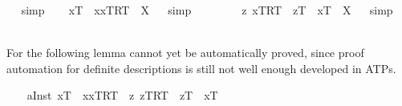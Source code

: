 \begin{isabellebody}
\isadelimproof
\ %
\endisadelimproof
%
\isatagproof
{}\isamarkupfalse%
\ simp\ \isamarkupfalse%
%
\endisatagproof
{\isafoldproof}%
%
\isadelimproof
%
\endisadelimproof
%
\isamarkuptrue%
\ \isamarkupfalse%
\ {\isachardoublequoteopen}{\isacharparenleft}x\isactrlsup T\ \isactrlbold {\isacharequal}\ {\isacharparenleft}\isactrlbold {\isasymiota}x{\isachardot}{\isasymlbrace}x\isactrlsup T{\isacharcomma}R\isactrlsup T{\isasymrbrace}{\isacharparenright}{\isacharparenright}\ {\isacharequal}\ X{\isachardoublequoteclose}%
\isadelimproof
\ %
\endisadelimproof
%
\isatagproof
{}\isamarkupfalse%
\ simp\ \isamarkupfalse%
\ \ \ \ %
%
\endisatagproof
{\isafoldproof}%
%
\isadelimproof
%
\endisadelimproof
\isanewline
\ \isamarkupfalse%
\ {\isachardoublequoteopen}{\isacharparenleft}\isactrlbold {\isasymforall}z{\isachardot}\ {\isacharparenleft}\isactrlbold {\isasymA}{\isacharparenleft}{\isasymlbrace}x\isactrlsup T{\isacharcomma}R\isactrlsup T{\isasymrbrace}{\isacharparenright}\ \isactrlbold {\isasymequiv}\ {\isacharparenleft}z\isactrlsup T\ \isactrlbold {\isacharequal}\ x\isactrlsup T{\isacharparenright}{\isacharparenright}{\isacharparenright}\ {\isacharequal}\ X{\isachardoublequoteclose}%
\isadelimproof
\ %
\endisadelimproof
%
\isatagproof
{}\isamarkupfalse%
\ simp\ \isamarkupfalse%
\ \ \ \ %
%
\endisatagproof
{\isafoldproof}%
%
\isadelimproof
%
\endisadelimproof
%
\begin{isamarkuptext}%
For the following lemma cannot yet be automatically proved, since proof automation for definite
  descriptions is still not well enough developed in ATPs.%
\end{isamarkuptext}%
\isamarkuptrue%
\ \ \isamarkupfalse%
\ a{}{}{\isacharunderscore}Inst{\isacharunderscore}{}{\isacharcolon}\ {\isachardoublequoteopen}{\isacharbrackleft}{\isacharparenleft}x\isactrlsup T\ \isactrlbold {\isacharequal}\ {\isacharparenleft}\isactrlbold {\isasymiota}x{\isachardot}{\isasymlbrace}x\isactrlsup T{\isacharcomma}R\isactrlsup T{\isasymrbrace}{\isacharparenright}{\isacharparenright}\ \isactrlbold {\isasymequiv}\ {\isacharparenleft}\isactrlbold {\isasymforall}z{\isachardot}\ {\isacharparenleft}\isactrlbold {\isasymA}{\isacharparenleft}{\isasymlbrace}z\isactrlsup T{\isacharcomma}R\isactrlsup T{\isasymrbrace}{\isacharparenright}\ \isactrlbold {\isasymequiv}\ {\isacharparenleft}z\isactrlsup T\ \isactrlbold {\isacharequal}\ x\isactrlsup T{\isacharparenright}{\isacharparenright}{\isacharparenright}{\isacharbrackright}\ {\isacharequal}\ {\isasymtop}{\isachardoublequoteclose}%

\end{isabellebody}
